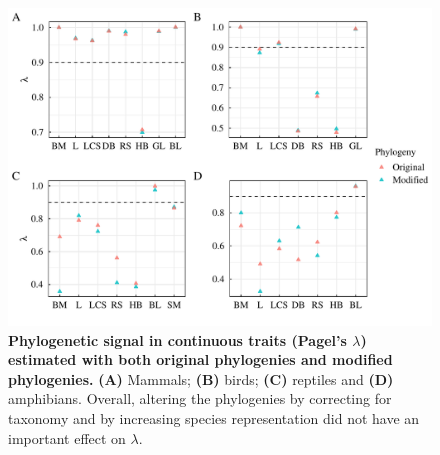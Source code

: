 \begin{figure}[h!]
\centering
\includegraphics[scale=0.7]{figures/chapter2/Phylosignal/Continuous}
\caption[Phylogenetic signal in continuous traits (Pagel's $\lambda$) estimated with both original phylogenies and modified phylogenies]{\textbf{Phylogenetic signal in continuous traits (Pagel's $\lambda$) estimated with both original phylogenies and modified phylogenies.} \textbf{(A)} Mammals; \textbf{(B)} birds; \textbf{(C)} reptiles and \textbf{(D)} amphibians. Overall, altering the phylogenies by correcting for taxonomy and by increasing species representation did not have an important effect on $\lambda$.}
\label{signalcontinuous}
\end{figure}

\pagebreak

